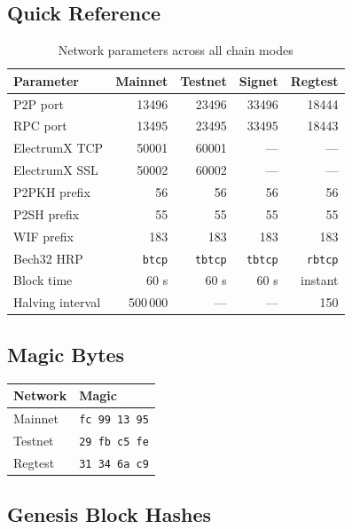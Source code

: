 \documentclass[12pt, a4paper]{article}
\begin{document}
\subsection{Quick Reference}

\begin{table}[h!]
\centering
\caption{Network parameters across all chain modes}
\begin{tabular}{@{}lrrrr@{}}
\toprule
\textbf{Parameter} & \textbf{Mainnet} & \textbf{Testnet} & \textbf{Signet} & \textbf{Regtest} \\
\midrule
P2P port          & 13496 & 23496 & 33496 & 18444 \\
RPC port          & 13495 & 23495 & 33495 & 18443 \\
ElectrumX TCP     & 50001 & 60001 & — & — \\
ElectrumX SSL     & 50002 & 60002 & — & — \\
P2PKH prefix      & 56    & 56    & 56  & 56 \\
P2SH prefix       & 55    & 55    & 55  & 55 \\
WIF prefix        & 183   & 183   & 183 & 183 \\
Bech32 HRP        & \texttt{btcp} & \texttt{tbtcp} & \texttt{tbtcp} & \texttt{rbtcp} \\
Block time        & 60 s  & 60 s  & 60 s & instant \\
Halving interval  & 500\,000 & — & — & 150 \\
\bottomrule
\end{tabular}
\end{table}

\subsection{Magic Bytes}

\begin{center}
\begin{tabular}{@{}ll@{}}
\toprule
\textbf{Network} & \textbf{Magic} \\
\midrule
Mainnet  & \texttt{fc 99 13 95} \\
Testnet  & \texttt{29 fb c5 fe} \\
Regtest  & \texttt{31 34 6a c9} \\
\bottomrule
\end{tabular}
\end{center}

\subsection{Genesis Block Hashes}
\end{document}
